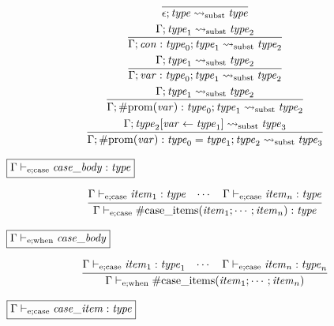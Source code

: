 \begin{gather*}
    \infer{\epsilon; \mathit{type} \rightsquigarrow_\mathrm{subst} \mathit{type}}{}
    \\
    \infer{\Gamma; \mathit{con}: \mathit{type}_0; \mathit{type}_1 \rightsquigarrow_\mathrm{subst} \mathit{type}_2}{
        \Gamma; \mathit{type}_1 \rightsquigarrow_\mathrm{subst} \mathit{type}_2
    }
    \\
    \infer{\Gamma; \mathit{var}: \mathit{type}_0; \mathit{type}_1 \rightsquigarrow_\mathrm{subst} \mathit{type}_2}{
        \Gamma; \mathit{type}_1 \rightsquigarrow_\mathrm{subst} \mathit{type}_2
    }
    \\
    \infer{\Gamma; \mathrm{\#prom}(\mathit{var}): \mathit{type}_0; \mathit{type}_1 \rightsquigarrow_\mathrm{subst} \mathit{type}_2}{
        \Gamma; \mathit{type}_1 \rightsquigarrow_\mathrm{subst} \mathit{type}_2
    }
    \\
    \infer{\Gamma; \mathrm{\#prom}(\mathit{var}): \mathit{type}_0 = \mathit{type}_1; \mathit{type}_2 \rightsquigarrow_\mathrm{subst} \mathit{type}_3}{
        \Gamma; \mathit{type}_2[\mathit{var} \assign \mathit{type}_1] \rightsquigarrow_\mathrm{subst} \mathit{type}_3
    }
\end{gather*}

$\fbox{$\Gamma \vdash_{\mathrm{e}; \mathrm{case}} \mathit{case\_body}: \mathit{type}$}$

\begin{gather*}
    \infer{\Gamma \vdash_{\mathrm{e}; \mathrm{case}} \mathrm{\#case\_items}(\mathit{item}_1; \cdots; \mathit{item}_n): \mathit{type}}{
        \Gamma \vdash_{\mathrm{e}; \mathrm{case}} \mathit{item}_1: \mathit{type}
        &
        \cdots
        &
        \Gamma \vdash_{\mathrm{e}; \mathrm{case}} \mathit{item}_n: \mathit{type}
    }
\end{gather*}

$\fbox{$\Gamma \vdash_{\mathrm{e}; \mathrm{when}} \mathit{case\_body}$}$

\begin{gather*}
    \infer{\Gamma \vdash_{\mathrm{e}; \mathrm{when}} \mathrm{\#case\_items}(\mathit{item}_1; \cdots; \mathit{item}_n)}{
        \Gamma \vdash_{\mathrm{e}; \mathrm{case}} \mathit{item}_1: \mathit{type}_1
        &
        \cdots
        &
        \Gamma \vdash_{\mathrm{e}; \mathrm{case}} \mathit{item}_n: \mathit{type}_n
    }
\end{gather*}

$\fbox{$\Gamma \vdash_{\mathrm{e}; \mathrm{case}} \mathit{case\_item}: \mathit{type}$}$


